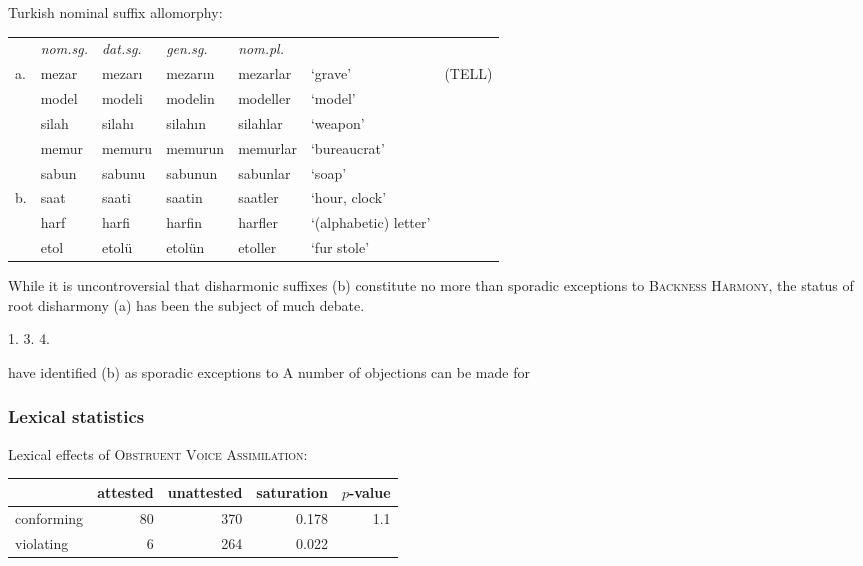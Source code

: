 \ex Turkish nominal suffix allomorphy: \vspace{6pt} \\
\begin{tabular}{l l l l l l l}
   & \emph{nom.sg.} & \emph{dat.sg.} & \emph{gen.sg.} & \emph{nom.pl.} \\
a. & mezar          & mezarı         & mezarın        & mezarlar       & `grave' & (TELL) \\
   & model          & modeli         & modelin        & modeller       & `model' \\
   & silah          & silahı         & silahın        & silahlar       & `weapon'     \\
   & memur          & memuru         & memurun        & memurlar       & `bureaucrat' \\
   & sabun          & sabunu         & sabunun        & sabunlar       & `soap'       \\
b. & saat           & saati          & saatin         & saatler        & `hour, clock' \\
   & harf           & harfi          & harfin         & harfler        & `(alphabetic) letter' \\ %
   & etol           & etolü          & etolün         & etoller        & `fur stole' \\
\end{tabular} \xe

While it is uncontroversial that disharmonic suffixes (\lastx b) constitute no more than sporadic exceptions to \textsc{Backness Harmony}, the status of root disharmony (\lastx a) has been the subject of much debate. 

1. \citet[][289]{Anderson1974} 
3. \citet{Clements1982}
4. \citet{Inkelas1997}

have identified (\lastx b) as sporadic exceptions to 
A number of objections can be made for 

\subsubsection{Lexical statistics}

\citet{TELL}

\ex Lexical effects of \textsc{Obstruent Voice Assimilation}: \vspace{6pt} \\
\begin{tabular}{l r r r r}
\toprule
           & attested & unattested & saturation & $p$-value \\
\midrule
conforming & 80 & 370 & 0.178 & \multirow{2}{*}{1.1\e{-11}}\\
violating  &  6 & 264 & 0.022 \\
\bottomrule
\end{tabular} \xe 

